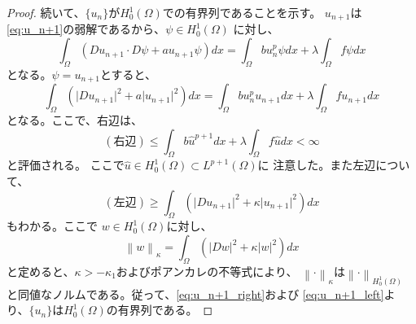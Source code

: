 \begin{proof}
 続いて、$\{u_n\}$が$H_0^1(\Omega)$での有界列であることを示す。
 $u_{n+1}$は\eqref{eq:u_n+1}の弱解であるから、$\psi \in H_0^1(\Omega)$
 に対し、
 \begin{equation}
  \int_\Omega (Du_{n+1} \cdot D\psi + a u_{n+1} \psi) dx 
   = \int_\Omega bu_n^p \psi dx + \lambda \int_\Omega f\psi dx
   \label{eq:u_n+1_weaksol}
 \end{equation}
 となる。$\psi = u_{n+1}$とすると、
 \[
 \int_\Omega (\lvert Du_{n+1} \rvert^2  + a \lvert u_{n+1} \rvert^2) dx 
 = \int_\Omega bu_n^p u_{n+1} dx + \lambda \int_\Omega f u_{n+1} dx
 \]
 となる。ここで、右辺は、
 \begin{equation}
  (\text{右辺}) \leq \int_\Omega b\hat{u}^{p+1} dx + \lambda
   \int_\Omega f \hat{u} dx < \infty \label{eq:u_n+1_right}
 \end{equation}
 と評価される。
 ここで$\hat{u} \in H_0^1(\Omega) \subset L^{p+1}(\Omega)$に
 注意した。また左辺について、
 \begin{equation}
  (\text{左辺}) \geq \int_\Omega \left( \lvert Du_{n+1} \rvert^2 + \kappa
   \lvert u_{n+1} \rvert^2 \right) dx \label{eq:u_n+1_left}
 \end{equation}
 もわかる。ここで
 $w \in H_0^1(\Omega)$に対し、
 \[
  \left\| w \right\|_\kappa = \int_\Omega \left( \lvert Dw \rvert^2 +
 \kappa \lvert w \rvert^2 \right) dx
 \]
 と定めると、$\kappa > -\kappa_1$およびポアンカレの不等式により、
 $\left\| \cdot \right\|_\kappa$は$\left\| \cdot
 \right\|_{H_0^1(\Omega)}$
 と同値なノルムである。従って、\eqref{eq:u_n+1_right}および
 \eqref{eq:u_n+1_left}より、$\{u_n\}$は$H_0^1(\Omega)$の有界列である。


\end{proof}
